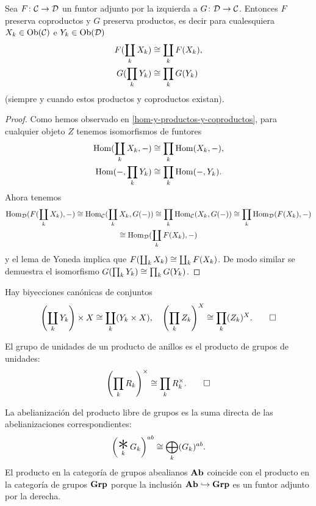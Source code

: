 \documentclass{article}
\numberwithin{equation}{section}
\theoremstyle{definition}
\begin{document}
\begin{observacion}
  \label{adjunto-a-la-izquierda-preserva-coproductos}
  Sea $F\colon \mathcal{C} \to \mathcal{D}$ un funtor adjunto por la izquierda a
  $G\colon \mathcal{D} \to \mathcal{C}$. Entonces $F$ preserva coproductos y $G$
  preserva productos, es decir para cualesquiera $X_k \in \operatorname{Ob} (\mathcal{C})$ e
  $Y_k \in \operatorname{Ob} (\mathcal{D})$
  \begin{align*}
    F (\coprod_k X_k) & \cong \coprod_k F (X_k),\\
    G (\prod_k Y_k) & \cong \prod_k G (Y_k)
  \end{align*}
  (siempre y cuando estos productos y coproductos existan).

  \begin{proof}
    Como hemos observado en \ref{hom-y-productos-y-coproductos}, para cualquier
    objeto $Z$ tenemos isomorfismos de funtores
    \begin{align*}
      \operatorname{Hom} (\coprod_k X_k, -) & \cong \prod_k \operatorname{Hom} (X_k, -),\\
      \operatorname{Hom} (-, \prod_k Y_k) & \cong \prod_k \operatorname{Hom} (-, Y_k).
    \end{align*}
    Ahora tenemos
    \begin{multline*}
      \operatorname{Hom}_\mathcal{D} (F (\coprod_k X_k), -) \cong \operatorname{Hom}_\mathcal{C} (\coprod_k X_k, G (-)) \cong \prod_k \operatorname{Hom}_\mathcal{C} (X_k, G (-)) \cong \prod_k \operatorname{Hom}_\mathcal{D} (F(X_k), -) \\
      \cong \operatorname{Hom}_\mathcal{D} (\coprod_k F(X_k), -)
    \end{multline*}
    y el lema de Yoneda implica que $F (\coprod_k X_k) \cong \coprod_k
    F(X_k)$. De modo similar se demuestra el isomorfismo
    $G (\prod_k Y_k) \cong \prod_k G (Y_k)$.
  \end{proof}
\end{observacion}

\begin{ejemplo}
  Hay biyecciones canónicas de conjuntos
  \[ \left( \coprod_k Y_k \right)\times X \cong \coprod_k (Y_k \times X), \quad
     \left(\prod_k Z_k\right)^X \cong \prod_k (Z_k)^X. \qedhere \]
\end{ejemplo}

\begin{ejemplo}
  El grupo de unidades de un producto de anillos es el producto de grupos de unidades:
  \[ \left(\prod_k R_k\right)^\times \cong \prod_k R_k^\times. \qedhere \]
\end{ejemplo}

\begin{ejemplo}
  La abelianización del producto libre de grupos es la suma directa de las
  abelianizaciones correspondientes:
  $$\left(\bigast_k G_k\right)^{ab} \isom \bigoplus_k (G_k)^{ab}.$$
  El producto en la categoría de grupos abealianos $\text{\bf Ab}$ coincide con el
  producto en la categoría de grupos $\text{\bf Grp}$ porque la inclusión
  $\text{\bf Ab} \hookrightarrow \text{\bf Grp}$ es un funtor adjunto por la derecha.
\end{ejemplo}
\end{document}
